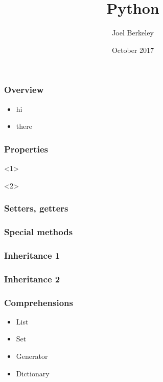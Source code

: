 \documentclass[12pt, xcolor={dvipsnames}]{beamer}
\author{Joel Berkeley}
\title{Python}
\institute{Verimatrix Bristol}
\date{October 2017}
\begin{document}
\begin{frame}
  \maketitle
\end{frame}

\begin{frame}
  \frametitle{Overview}

  \begin{itemize}
    \item hi
    \item there
  \end{itemize}
\end{frame}

\begin{frame}[fragile]
  \frametitle{Properties}
  \begin{onlyenv}<1>
    
  \end{onlyenv}
  \begin{onlyenv}<2>
    
  \end{onlyenv}
\end{frame}

\begin{frame}[fragile]
  \frametitle{Setters, getters}
  
\end{frame}

\begin{frame}[fragile]
  \frametitle{Special methods}
  
\end{frame}



\begin{frame}[fragile]
\frametitle{Inheritance 1}

\end{frame}

\begin{frame}[fragile]
\frametitle{Inheritance 2}

\end{frame}

\begin{frame}[fragile]
  \frametitle{Comprehensions}
  
  \begin{itemize}
    \item<1-> List 
    \item<2-> Set 
    \item<3-> Generator 
    \item<4-> Dictionary 
  \end{itemize}
\end{frame}
\end{document}
